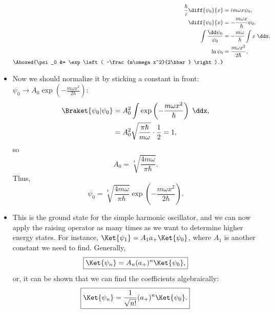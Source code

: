 \begin{itemize}
\begin{align*}
            \frac{\hbar}{i}\diff{\psi_0}{x} &= im\omega x\psi_0, \\
            \diff{\psi_0}{x} &= -\frac{m\omega x}{\hbar} \psi_0, \\
            \int \frac{\dd\psi_0}{\psi_0} &= -\frac{m\omega}{\hbar}\int x\;\ddx, \\
            \ln\psi_0 &= \frac{m\omega x^2}{2\hbar}, \\
            \Aboxed{\psi_0 &= \exp\left( -\frac{m\omega x^2}{2\hbar} \right).}
        \end{align*}
    \item Now we should normalize it by sticking a constant in front: $\psi_0 \rightarrow A_0\exp\left( -\frac{m\omega x^2}{2\hbar} \right)$:
        \begin{align*}
            \Braket{\psi_0 | \psi_0} &= A_0^2 \int \exp\left( -\frac{m\omega x^2}{\hbar} \right) \;\ddx, \\
            &= A_0^2 \sqrt{\frac{\pi\hbar}{m\omega}} \cdot \frac{1}{2} = 1,
        \end{align*}
        so
        \begin{equation*}
            A_0 = \sqrt[4]{\frac{4m\omega}{\pi\hbar}}.
        \end{equation*}
        Thus,
        \begin{equation*}
            \boxed{\psi_0 = \sqrt[4]{\frac{4m\omega}{\pi\hbar}}\exp\left( -\frac{m\omega x^2}{2\hbar} \right).}
        \end{equation*}
    \item This is the ground state for the simple harmonic oscillator, and we can now apply the raising operator as many times as we want to determine higher energy states. For instance, $\Ket{\psi_1} = A_1 a_+ \Ket{\psi_0}$, where $A_1$ is another constant we need to find. Generally,
        \begin{equation}
            \boxed{\Ket{\psi_n} = A_n (a_+)^n \Ket{\psi_0},}\label{SHOPsin1}
        \end{equation}
        or, it can be shown that we can find the coefficients algebraically:
        \begin{equation}
            \boxed{\Ket{\psi_n} = \frac{1}{\sqrt{n!}}(a_+)^n \Ket{\psi_0}.}\label{SHOPsin2}
        \end{equation}
\end{itemize}








